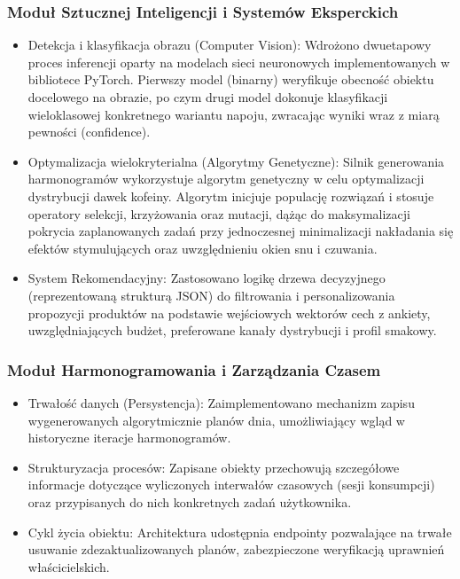 \documentclass[12pt,a4paper]{article}
\begin{document}
\subsubsection{Moduł Sztucznej Inteligencji i Systemów Eksperckich}
\begin{itemize}
    \item Detekcja i klasyfikacja obrazu (Computer Vision): Wdrożono dwuetapowy proces inferencji oparty na modelach sieci neuronowych implementowanych w bibliotece PyTorch. Pierwszy model (binarny) weryfikuje obecność obiektu docelowego na obrazie, po czym drugi model dokonuje klasyfikacji wieloklasowej konkretnego wariantu napoju, zwracając wyniki wraz z miarą pewności (confidence).
    \item Optymalizacja wielokryterialna (Algorytmy Genetyczne): Silnik generowania harmonogramów wykorzystuje algorytm genetyczny w celu optymalizacji dystrybucji dawek kofeiny. Algorytm inicjuje populację rozwiązań i stosuje operatory selekcji, krzyżowania oraz mutacji, dążąc do maksymalizacji pokrycia zaplanowanych zadań przy jednoczesnej minimalizacji nakładania się efektów stymulujących oraz uwzględnieniu okien snu i czuwania.
    \item System Rekomendacyjny: Zastosowano logikę drzewa decyzyjnego (reprezentowaną strukturą JSON) do filtrowania i personalizowania propozycji produktów na podstawie wejściowych wektorów cech z ankiety, uwzględniających budżet, preferowane kanały dystrybucji i profil smakowy.
\end{itemize}

\subsubsection{Moduł Harmonogramowania i Zarządzania Czasem}
\begin{itemize}
    \item Trwałość danych (Persystencja): Zaimplementowano mechanizm zapisu wygenerowanych algorytmicznie planów dnia, umożliwiający wgląd w historyczne iteracje harmonogramów.
    \item Strukturyzacja procesów: Zapisane obiekty przechowują szczegółowe informacje dotyczące wyliczonych interwałów czasowych (sesji konsumpcji) oraz przypisanych do nich konkretnych zadań użytkownika.
    \item Cykl życia obiektu: Architektura udostępnia endpointy pozwalające na trwałe usuwanie zdezaktualizowanych planów, zabezpieczone weryfikacją uprawnień właścicielskich.
\end{itemize}
\end{document}

